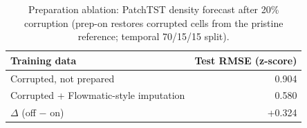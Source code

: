 \begin{table}[H]
  \centering
  \caption{Preparation ablation: PatchTST density forecast after 20\% corruption (prep-on restores corrupted cells from the pristine reference; temporal 70/15/15 split).}
  \label{tab:prep-ablation}
  \begin{tabular}{@{}lr@{}}
    \toprule
    Training data & Test RMSE (z-score) \\
    \midrule
    Corrupted, not prepared & 0.904 \\
    Corrupted + Flowmatic-style imputation & 0.580 \\
    $\Delta$ (off $-$ on) & +0.324 \\
    \bottomrule
  \end{tabular}
\end{table}
